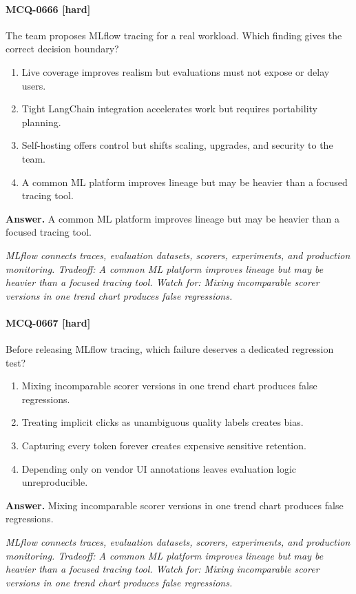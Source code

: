 \paragraph{MCQ-0666 [hard]} The team proposes MLflow tracing for a real workload. Which finding gives the correct decision boundary?
\begin{enumerate}[label=\Alph*.]
\item Live coverage improves realism but evaluations must not expose or delay users.
\item Tight LangChain integration accelerates work but requires portability planning.
\item Self-hosting offers control but shifts scaling, upgrades, and security to the team.
\item A common ML platform improves lineage but may be heavier than a focused tracing tool.
\end{enumerate}
\noindent\textbf{Answer.} A common ML platform improves lineage but may be heavier than a focused tracing tool.
\par\textit{MLflow connects traces, evaluation datasets, scorers, experiments, and production monitoring. Tradeoff: A common ML platform improves lineage but may be heavier than a focused tracing tool. Watch for: Mixing incomparable scorer versions in one trend chart produces false regressions.}
\paragraph{MCQ-0667 [hard]} Before releasing MLflow tracing, which failure deserves a dedicated regression test?
\begin{enumerate}[label=\Alph*.]
\item Mixing incomparable scorer versions in one trend chart produces false regressions.
\item Treating implicit clicks as unambiguous quality labels creates bias.
\item Capturing every token forever creates expensive sensitive retention.
\item Depending only on vendor UI annotations leaves evaluation logic unreproducible.
\end{enumerate}
\noindent\textbf{Answer.} Mixing incomparable scorer versions in one trend chart produces false regressions.
\par\textit{MLflow connects traces, evaluation datasets, scorers, experiments, and production monitoring. Tradeoff: A common ML platform improves lineage but may be heavier than a focused tracing tool. Watch for: Mixing incomparable scorer versions in one trend chart produces false regressions.}
